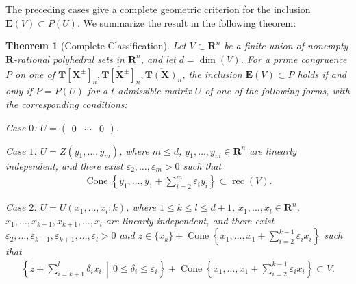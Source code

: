 \documentclass[a4paper,12pt]{amsart}
\theoremstyle{plain}
\newtheorem{theorem}{Theorem}[section]
\theoremstyle{definition}
\begin{document}
\smallskip

The preceding cases give a complete geometric criterion for the inclusion $\boldsymbol{E}(V) \subset P(U)$.
We summarize the result in the following theorem:

\begin{theorem}[Complete Classification]
    \label{thm3}
Let $V \subset \boldsymbol{R}^n$ be a finite union of nonempty $\boldsymbol{R}$-rational polyhedral sets in $\boldsymbol{R}^n$, and let $d = \operatorname{dim}(V)$.
For a prime congruence $P$ on one of $\boldsymbol{T}[\boldsymbol{X}^{\pm}]_n, \overline{\boldsymbol{T}[\boldsymbol{X}^{\pm}]}_n, \overline{\boldsymbol{T}(\boldsymbol{X})}_n$, the inclusion $\boldsymbol{E}(V) \subset P$ holds if and only if 
$P = P(U)$ for a $t$-admissible matrix $U$ of one of the following forms, with the corresponding conditions:

Case $0$: $U = \begin{pmatrix} 0 & \cdots &0 \end{pmatrix}$.

Case $1$: $U = Z(y_1, \ldots, y_m)$, where $m \le d$, $y_1, \ldots, y_m \in \boldsymbol{R}^n$ are linearly independent, and there exist $\varepsilon_2, \ldots, \varepsilon_m > 0$ such that 
\begin{align*}
\operatorname{Cone}\left\{ y_1, \ldots, y_1 + \sum_{i = 2}^m \varepsilon_i y_i \right\} \subset \operatorname{rec}(V).
\end{align*}

Case $2$: $U = U(x_1, \ldots, x_l;k)$, where $1 \le k \le l \le d + 1$, $x_1, \ldots, x_l \in \boldsymbol{R}^n$, $x_1, \ldots, x_{k-1}, x_{k+1}, \ldots, x_l$ are linearly independent, and there exist $\varepsilon_2, \ldots, \varepsilon_{k - 1}, \varepsilon_{k + 1}, \ldots, \varepsilon_l > 0$ and $z \in \{ x_k \} + \operatorname{Cone}\left\{ x_1, \ldots, x_1 + \sum_{i = 2}^{k - 1} \varepsilon_i x_i \right\}$ such that
\begin{align*}
\left\{ z + \sum_{i = k + 1}^l \delta_i x_i \,\middle|\, 0 \le \delta_i \le \varepsilon_i \right\} + \operatorname{Cone}\left\{ x_1, \ldots, x_1 + \sum_{i = 2}^{k - 1} \varepsilon_i x_i \right\} \subset V.
\end{align*}
\end{theorem}
\end{document}
